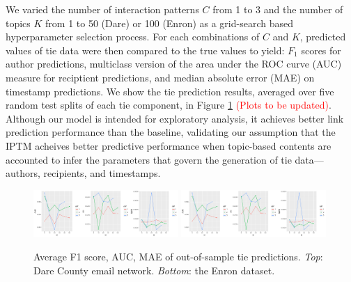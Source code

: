 \documentclass{article}
\begin{document}
 	   We varied the number of interaction patterns $C$ from 1 to 3 and the number of topics $K$ from 1 to 50 (Dare) or 100 (Enron) as a grid-search based hyperparameter selection process.  For each combinations of $C$ and $K$, predicted values of tie data were then compared to the true values to yield: $F_1$ scores for author predictions, multiclass version of the area under the ROC curve (AUC) measure \cite{hand2001simple} for reciptient predictions, and median absolute error (MAE) on timestamp predictions. We show the tie prediction results, averaged over five random test splits of each tie component, in Figure \ref{fig:PPE} \textcolor{red}{(Plots to be updated)}. Although our model is intended for exploratory analysis, it achieves better link prediction performance than the baseline, validating our assumption that the IPTM acheives better predictive performance when topic-based contents are accounted to infer the parameters that govern the generation of tie data---authors, recipients, and timestamps.
 	   \begin{figure}[tb]
 	   	\centering
 	   	\includegraphics[width = 0.49\textwidth, trim= 0.7cm 0cm 0cm 0cm, clip=true]{plots/Dare_PPE.pdf} 
 	   	\includegraphics[width = 0.49\textwidth, trim= 0.7cm 0cm 0cm 0cm, clip=true]{plots/Dare_PPE.pdf}   
 	   	\caption{Average F1 score,  AUC, MAE of out-of-sample tie predictions. \textit{Top}: Dare County email network. \textit{Bottom}: the Enron dataset.}
 	   	\label{fig:PPE}	
 	   \end{figure}
\end{document}
